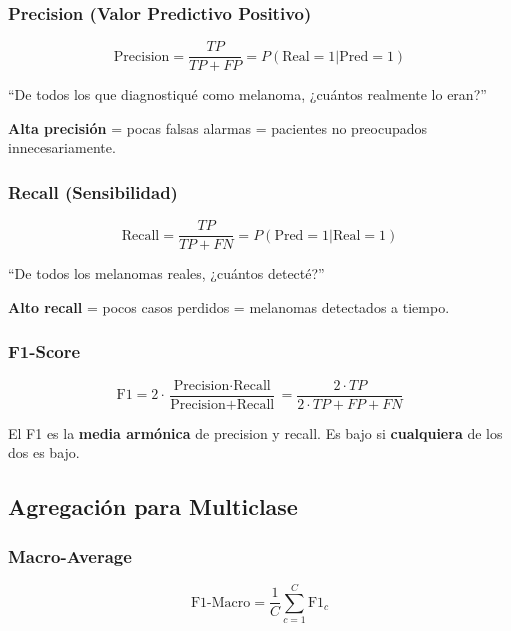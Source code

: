 \documentclass[12pt,a4paper]{article}
\begin{document}
\subsubsection{Precision (Valor Predictivo Positivo)}

\begin{equation}
\text{Precision} = \frac{TP}{TP + FP} = P(\text{Real}=1 | \text{Pred}=1)
\end{equation}

``De todos los que diagnostiqué como melanoma, ¿cuántos realmente lo eran?''

\textbf{Alta precisión} = pocas falsas alarmas = pacientes no preocupados innecesariamente.

\subsubsection{Recall (Sensibilidad)}

\begin{equation}
\text{Recall} = \frac{TP}{TP + FN} = P(\text{Pred}=1 | \text{Real}=1)
\end{equation}

``De todos los melanomas reales, ¿cuántos detecté?''

\textbf{Alto recall} = pocos casos perdidos = melanomas detectados a tiempo.

\subsubsection{F1-Score}

\begin{equation}
\text{F1} = 2 \cdot \frac{\text{Precision} \cdot \text{Recall}}{\text{Precision} + \text{Recall}} = \frac{2 \cdot TP}{2 \cdot TP + FP + FN}
\end{equation}

El F1 es la \textbf{media armónica} de precision y recall. Es bajo si \textbf{cualquiera} de los dos es bajo.

\subsection{Agregación para Multiclase}

\subsubsection{Macro-Average}

\begin{equation}
\text{F1-Macro} = \frac{1}{C} \sum_{c=1}^{C} \text{F1}_c
\end{equation}
\end{document}
